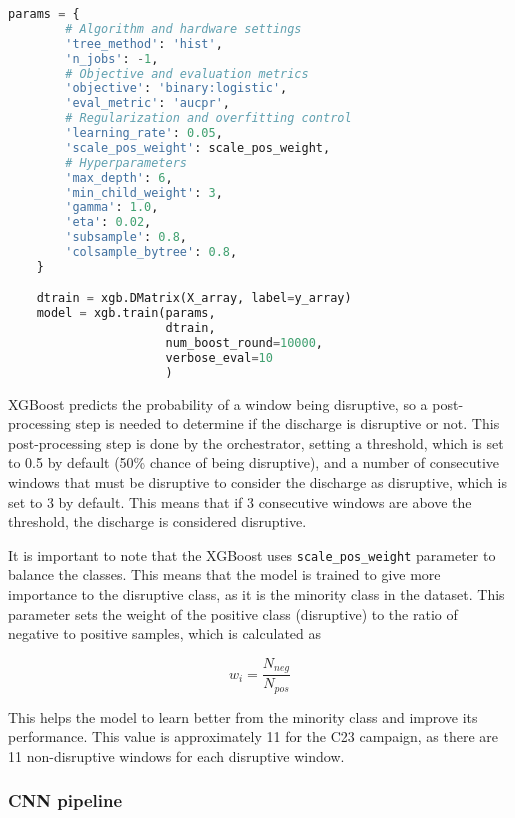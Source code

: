 \begin{lstlisting}[language=Python, caption={XGBoost model parameters}, label={lst:xgboost-params}]
    params = {
        # Algorithm and hardware settings
        'tree_method': 'hist',
        'n_jobs': -1,
        # Objective and evaluation metrics
        'objective': 'binary:logistic',
        'eval_metric': 'aucpr',
        # Regularization and overfitting control
        'learning_rate': 0.05,
        'scale_pos_weight': scale_pos_weight,
        # Hyperparameters
        'max_depth': 6,
        'min_child_weight': 3,
        'gamma': 1.0,
        'eta': 0.02,
        'subsample': 0.8,
        'colsample_bytree': 0.8,
    }

    dtrain = xgb.DMatrix(X_array, label=y_array)
    model = xgb.train(params, 
                      dtrain, 
                      num_boost_round=10000, 
                      verbose_eval=10
                      )

\end{lstlisting}

XGBoost predicts the probability of a window being disruptive, so a post-processing step is needed to determine if the discharge is disruptive or not. This post-processing step is done by the orchestrator, setting a threshold, which is set to 0.5 by default (50\% chance of being disruptive), and a number of consecutive windows that must be disruptive to consider the discharge as disruptive, which is set to 3 by default. This means that if 3 consecutive windows are above the threshold, the discharge is considered disruptive.

It is important to note that the XGBoost uses \texttt{scale\_pos\_weight} parameter to balance the classes. This means that the model is trained to give more importance to the disruptive class, as it is the minority class in the dataset. This parameter sets the weight of the positive class (disruptive) to the ratio of negative to positive samples, which is calculated as 

\begin{equation}
    w_i = \frac{N_{neg}}{N_{pos}}
    \label{eq:scale_pos_weight}
\end{equation}

This helps the model to learn better from the minority class and improve its performance. This value is approximately 11 for the C23 campaign, as there are 11 non-disruptive windows for each disruptive window.

\subsubsection{\acs{CNN} pipeline}\label{sec:cnn-implementation}

